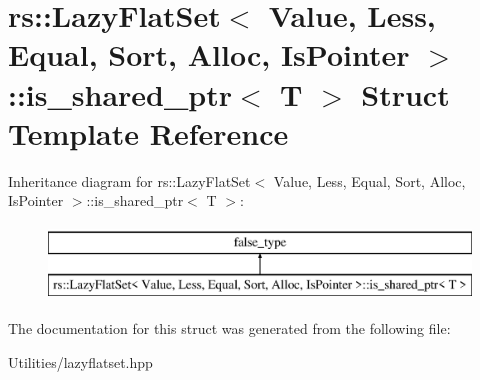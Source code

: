 \hypertarget{structrs_1_1_lazy_flat_set_1_1is__shared__ptr}{\section{rs\+:\+:Lazy\+Flat\+Set$<$ Value, Less, Equal, Sort, Alloc, Is\+Pointer $>$\+:\+:is\+\_\+shared\+\_\+ptr$<$ T $>$ Struct Template Reference}
\label{structrs_1_1_lazy_flat_set_1_1is__shared__ptr}
}
Inheritance diagram for rs\+:\+:Lazy\+Flat\+Set$<$ Value, Less, Equal, Sort, Alloc, Is\+Pointer $>$\+:\+:is\+\_\+shared\+\_\+ptr$<$ T $>$\+:\begin{figure}[H]
\begin{center}
\leavevmode
\includegraphics[height=2.000000cm]{structrs_1_1_lazy_flat_set_1_1is__shared__ptr}
\end{center}
\end{figure}


The documentation for this struct was generated from the following file\+:\begin{DoxyCompactItemize}
\item 
Utilities/lazyflatset.\+hpp\end{DoxyCompactItemize}
